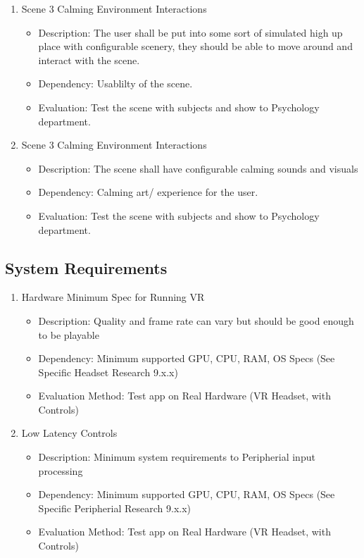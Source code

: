 \documentclass[a4paper,10pt]{article}
\begin{document}
\begin{enumerate}
		
		\item Scene 3 Calming Environment Interactions
		\begin{itemize}
		 \item Description: The user shall be put into some sort of simulated high up place with configurable scenery, they should be able to move around and interact with the scene.
		 \item Dependency: Usablilty of the scene.
		 \item Evaluation: Test the scene with subjects and show to Psychology department. 
		\end{itemize}
		\item Scene 3 Calming Environment Interactions 
		\begin{itemize}
		 \item Description: The scene shall have configurable calming sounds and visuals
		 \item Dependency: Calming art/ experience for the user.
		 \item Evaluation: Test the scene with subjects and show to Psychology department. 
		\end{itemize}
		
	\end{enumerate}

	\subsection{System Requirements}
	\begin{enumerate}
	 \item Hardware Minimum Spec for Running VR
	 \begin{itemize}
	  \item Description: Quality and frame rate can vary but should be good enough to be playable
	  \item Dependency: Minimum supported GPU, CPU, RAM, OS Specs (See Specific Headset Research 9.x.x) 
	  \item Evaluation Method: Test app on Real Hardware (VR Headset, with Controls)
	 \end{itemize}
	 \item Low Latency Controls
	 \begin{itemize}
	  \item Description: Minimum system requirements to Peripherial input processing
	  \item Dependency: Minimum supported GPU, CPU, RAM, OS Specs (See Specific Peripherial Research 9.x.x) 
	  \item Evaluation Method: Test app on Real Hardware (VR Headset, with Controls)
	 \end{itemize}
	\end{enumerate}
	
\end{document}
